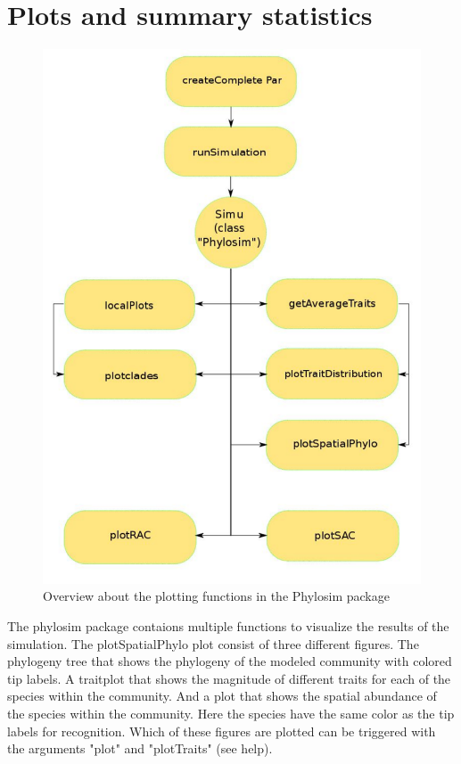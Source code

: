 \documentclass [a4paper]{tufte-book}\usepackage[]{graphicx}\usepackage[]{color}
\begin{document}
\section{Plots and summary statistics}
\begin{figure}[h]
	\centering
	\includegraphics[width=12cm]{flowchart_plots} %
	\caption{Overview about the plotting functions in the Phylosim package}\label{fig: plots}
\end{figure} 
\FloatBarrier
The phylosim package contaions multiple functions to visualize the results of the simulation.
The plotSpatialPhylo plot consist of three different figures. The phylogeny tree that shows the phylogeny of the modeled community with colored tip labels. A traitplot that shows the magnitude of different traits for each of the species within the community. And a plot that shows the spatial abundance of the species within the community. Here the species have the same color as the tip labels for recognition. Which of these figures are plotted can be triggered with the arguments "plot" and "plotTraits" (see help).\\
\end{document}
